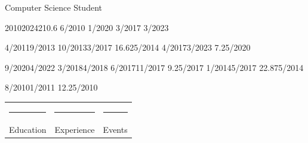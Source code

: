 \documentclass[11pt]{thyv}
\begin{document}
\begin{textblock}{5}
		{Computer Science Student}

		\strut

	\begin{thyV}{2010}{2024}{21}{0.6\linewidth}
		 				{6/2010}
		 							{1/2020}
		 						{3/2017}
		 						{3/2023}
		
		 	{4/2011}{9/2013} 	{}
		 			{10/2013}{3/2017} 	{16.625/2014} 
		 			{4/2017}{3/2023} 	{7.25/2020}

		 			{9/2020}{4/2022} 	{}
		 					{3/2018}{4/2018} 	{}
		 				{6/2017}{11/2017} 	{9.25/2017}
		 					{1/2014}{5/2017} 	{22.875/2014}

		 	{8/2010}{1/2011} 	{12.25/2010}
	\end{thyV}

		  
		
		\begin{tabular}{lll}
		{\rule{1.5cm}{3pt}} & {\rule{1.5cm}{3pt}} & {\rule{1.5cm}{3pt}} \\
		Education & Experience & Events
		\end{tabular}

	\end{textblock}
\end{document}
